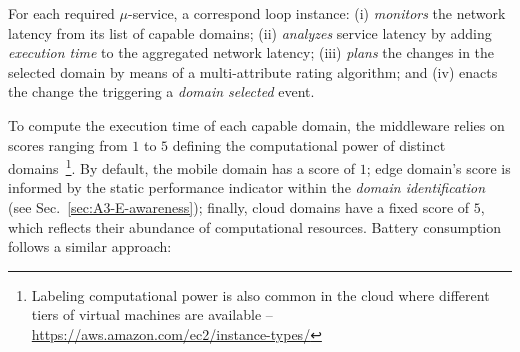 
For each required $\mu$-service, a correspond loop instance: (i) \textit{monitors} the network latency from its list of capable domains; (ii) \textit{analyzes} service latency by adding \textit{execution time} to the aggregated network latency;  (iii) \textit{plans} the changes in the selected domain by means of a multi-attribute rating algorithm; and (iv) enacts the change the triggering a \textit{domain selected} event.



To compute the execution time of each capable domain, the middleware relies on scores ranging from $1$ to $5$ defining the computational power of distinct domains~\footnote{Labeling computational power is also common in the cloud where different tiers of virtual machines are available -- \url{https://aws.amazon.com/ec2/instance-types/}}. By default, the mobile domain has a score of $1$; edge domain's score is informed by the static performance indicator within the \textit{domain identification} (see Sec.~\ref{sec:A3-E-awareness}); finally, cloud domains have a fixed score of $5$, which reflects their abundance of computational resources. Battery consumption follows a similar approach: 



